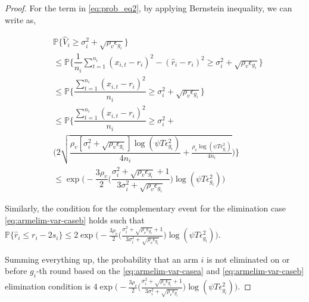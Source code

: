 \begin{proof}
  
For the term in \ref{eq:prob_eq2}, by applying Bernstein inequality, we can write as,
\begin{small}
\begin{align*}
&\mathbb{P}\bigg\lbrace \hat{V}_{i}\geq \sigma_{i}^{2}+\sqrt{\rho_{v}\epsilon_{g_{i}}}\bigg\rbrace\\
&\leq \mathbb{P}\bigg\lbrace \dfrac{1}{n_{i}}\sum_{t=1}^{n_{i}}(x_{i,t}-r_{i})^{2}-(\hat{r}_{i}-r_{i})^{2}\geq \sigma_{i}^{2}+\sqrt{\rho_{v}\epsilon_{g_{i}}}\bigg\rbrace\\
&\leq \mathbb{P}\bigg\lbrace \dfrac{\sum_{t=1}^{n_{i}}(x_{i,t}-r_{i})^{2}}{n_{i}}\geq \sigma_{i}^{2}+\sqrt{\rho_{v}\epsilon_{g_{i}}} \bigg\rbrace\\
&\leq \mathbb{P}\bigg\lbrace \dfrac{\sum_{t=1}^{n_{i}}(x_{i,t}-r_{i})^{2}}{n_{i}}\geq \sigma_{i}^{2} +\\
&\bigg(2\sqrt{\dfrac{\rho_v [\sigma_{i}^{2}+\sqrt{\rho_{v}\epsilon_{g_{i}}}]\log(\psi T\epsilon_{g_{i}}^{2})}{4n_{i}}+\frac{\rho_v \log{(\psi T\epsilon_{g_{i}}^{2})}}{4 n_{i}}}\bigg)\bigg\rbrace\\
&\leq \exp\bigg(- \dfrac{3\rho_v}{2} \bigg(\dfrac{\sigma_{i}^{2}+\sqrt{\rho_{v}\epsilon_{g_{i}}}+1}{3\sigma_{i}^{2}+\sqrt{\rho_v \epsilon_{g_{i}}}}\bigg) \log(\psi T\epsilon_{g_{i}}^{2}) \bigg) 
\end{align*}
\end{small}
 
  
Similarly, the condition for the complementary event for the elimination case \ref{eq:armelim-var-caseb} holds such that $\mathbb{P}\lbrace\hat{r}_{i}\leq r_{i} - 2s_{i}\rbrace \leq 2\exp\bigg(- \frac{3\rho_v}{2} \bigg(\frac{\sigma_{i}^{2}+\sqrt{\rho_{v}\epsilon_{g_{i}}}+1}{3\sigma_{i}^{2}+\sqrt{\rho_v \epsilon_{g_{i}}}}\bigg) \log(\psi T\epsilon_{g_{i}}^{2}) \bigg)$.

  Summing everything up, the probability that an arm ${i}$ is not eliminated on or before $g_{i}$-th round based on the \ref{eq:armelim-var-casea} and \ref{eq:armelim-var-caseb} elimination condition is  $4\exp\bigg(- \frac{3\rho_v}{2} \bigg(\frac{\sigma_{i}^{2}+\sqrt{\rho_{v}\epsilon_{g_{i}}}+1}{3\sigma_{i}^{2}+\sqrt{\rho_v \epsilon_{g_{i}}}}\bigg) \log(\psi T\epsilon_{g_{i}}^{2}) \bigg)$. 
  

\end{proof}
